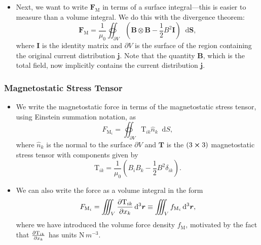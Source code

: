 \documentclass[11pt, a4paper]{article}
\newcommand{\diff}{\mathop{}\!\mathrm{d}} %
\newcommand{\dr}{\diff^{3} \r}  %
\renewcommand{\vec}[1]{\bm{#1}} %
\newcommand{\mat}[1]{\mathbf{#1}} %
\renewcommand{\r}{\vec{r}}
\newcommand{\B}{\vec{B}} %
\newcommand{\TT}{\mathrm{T}}  %
\newcommand{\mm}{\mu_{0}}  %
\renewcommand{\j}{\vec{j}}  %
\begin{document}
\begin{itemize}
	\item Next, we want to write $ \vec{F}_{\text{M}} $ in terms of a surface integral---this is easier to measure than a volume integral. We do this with the divergence theorem:
	\begin{equation*}
		\vec{F}_{\text{M}} = \frac{1}{\mm}\oiint_{\partial V}\left(\B \otimes \B - \frac{1}{2}B^{2}\mat{I}\right)\diff \vec{S},
	\end{equation*}
	where $ \mat{I} $ is the identity matrix and $ \partial V $ is the surface of the region containing the original current distribution $ \j $. Note that the quantity $ \B $, which is the total field, now implicitly contains the current distribution $ \j $.
\end{itemize}


\subsubsection{Magnetostatic Stress Tensor}
\begin{itemize}
	\item We write the magnetostatic force in terms of the magnetostatic stress tensor, using Einstein summation notation, as
	\begin{equation*}
		F_{\text{M}_{i}} = \oiint_{\partial V} \TT_{ik} \hat{n}_{k}\diff S,
	\end{equation*}
	where $ \hat{n}_{k} $ is the normal to the surface $ \partial V $ and $ \mat{T} $ is the $ (3 \cross 3) $ magnetostatic stress tensor with components given by
	\begin{equation*}
		\TT_{ik} = \frac{1}{\mm}\left(B_{i}B_{k} - \frac{1}{2}B^{2}\delta_{ik}\right).
	\end{equation*}
	
	\item We can also write the force as a volume integral in the form
	\begin{equation*}
		F_{\text{M}_{i}} = \iiint_{V}\pdv{\TT_{ik}}{x_{k}}\dr \equiv \iiint_{V}f_{\text{M}_{i}} \dr,
	\end{equation*} 
	where we have introduced the volume force density $ f_{\text{M}} $, motivated by the fact that $ \pdv{\TT_{ik}}{x_{k}} $ has units $ \si{\newton \, m^{-3}} $.
	
\end{itemize}
\end{document}
